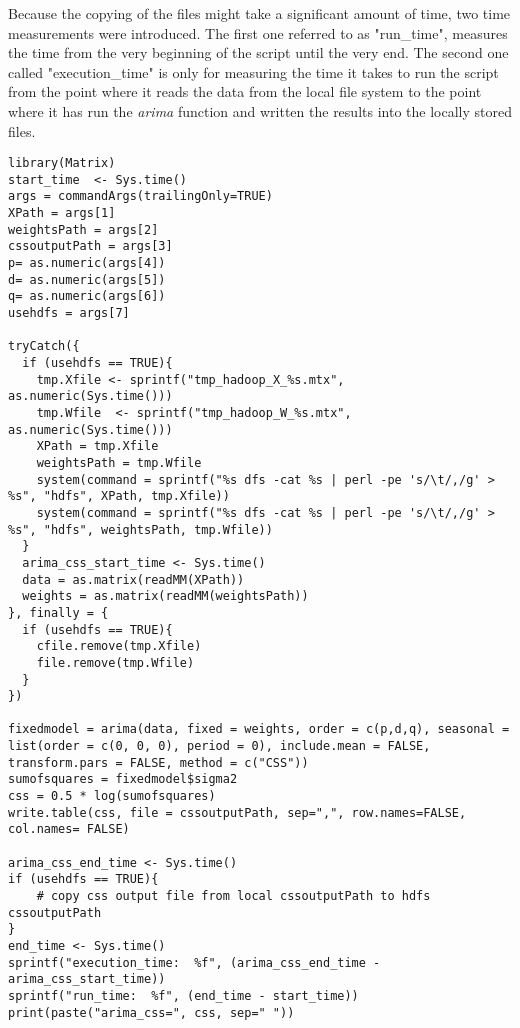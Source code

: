Because the copying of the files might take a significant amount of time, two time measurements were introduced. The first one referred to as "run\_time", measures the time from the very beginning of the script until the very end. The second one called "execution\_time" is only for measuring the time it takes to run the script from the point where it reads the data from the local file system to the point where it has run the \textit{arima} function and written the results into the locally stored files.

{\centering
\begin{verbatim}
library(Matrix)
start_time  <- Sys.time()
args = commandArgs(trailingOnly=TRUE)
XPath = args[1]
weightsPath = args[2]
cssoutputPath = args[3]
p= as.numeric(args[4])
d= as.numeric(args[5])
q= as.numeric(args[6])
usehdfs = args[7]

tryCatch({
  if (usehdfs == TRUE){
    tmp.Xfile <- sprintf("tmp_hadoop_X_%s.mtx", as.numeric(Sys.time()))
    tmp.Wfile  <- sprintf("tmp_hadoop_W_%s.mtx", as.numeric(Sys.time()))
    XPath = tmp.Xfile
    weightsPath = tmp.Wfile
    system(command = sprintf("%s dfs -cat %s | perl -pe 's/\t/,/g' > %s", "hdfs", XPath, tmp.Xfile))
    system(command = sprintf("%s dfs -cat %s | perl -pe 's/\t/,/g' > %s", "hdfs", weightsPath, tmp.Wfile))
  }
  arima_css_start_time <- Sys.time()
  data = as.matrix(readMM(XPath))
  weights = as.matrix(readMM(weightsPath))
}, finally = {
  if (usehdfs == TRUE){
    cfile.remove(tmp.Xfile)
    file.remove(tmp.Wfile)
  }
})
  
fixedmodel = arima(data, fixed = weights, order = c(p,d,q), seasonal = list(order = c(0, 0, 0), period = 0), include.mean = FALSE, transform.pars = FALSE, method = c("CSS"))
sumofsquares = fixedmodel$sigma2
css = 0.5 * log(sumofsquares)
write.table(css, file = cssoutputPath, sep=",", row.names=FALSE, col.names= FALSE)

arima_css_end_time <- Sys.time()
if (usehdfs == TRUE){
    # copy css output file from local cssoutputPath to hdfs cssoutputPath
}
end_time <- Sys.time()
sprintf("execution_time:  %f", (arima_css_end_time - arima_css_start_time))
sprintf("run_time:  %f", (end_time - start_time))
print(paste("arima_css=", css, sep=" "))
\end{verbatim}
\vspace*{-0.3cm}
}


